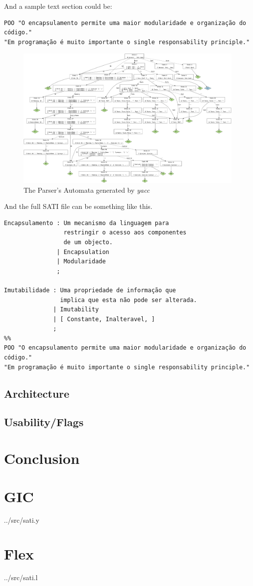 \documentclass[a4paper]{report}
\begin{document}
And a sample text section could be:

\begin{verbatim}
POO "O encapsulamento permite uma maior modularidade e organização do código."
"Em programação é muito importante o single responsability principle."
\end{verbatim}

\begin{figure}[H]
    \includegraphics[width=\textwidth]{./sati.jpg}
    \caption{The Parser's Automata generated by \textit{yacc}}
\end{figure}

And the full SATI file can be something like this.

\begin{verbatim}
Encapsulamento : Um mecanismo da linguagem para
                 restringir o acesso aos componentes
                 de um objecto.
               | Encapsulation
               | Modularidade
               ;

Imutabilidade : Uma propriedade de informação que
                implica que esta não pode ser alterada.
              | Imutability
              | [ Constante, Inalteravel, ]
              ;
%%
POO "O encapsulamento permite uma maior modularidade e organização do código."
"Em programação é muito importante o single responsability principle."
\end{verbatim}

\section{Architecture}

\section{Usability/Flags}

\chapter{Conclusion}

\appendix

\chapter{GIC}


{../src/sati.y}

\chapter{Flex}


{../src/sati.l}
\end{document}
